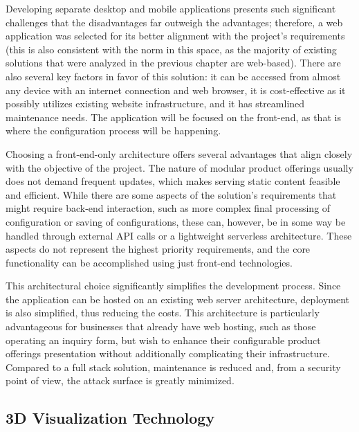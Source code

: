 Developing separate desktop and mobile applications presents such significant challenges that the disadvantages far outweigh the advantages; therefore, a web application was selected for its better alignment with the project's requirements (this is also consistent with the norm in this space, as the majority of existing solutions that were analyzed in the previous chapter are web-based). There are also several key factors in favor of this solution: it can be accessed from almost any device with an internet connection and web browser, it is cost-effective as it possibly utilizes existing website infrastructure, and it has streamlined maintenance needs. The application will be focused on the front-end, as that is where the configuration process will be happening.

Choosing a front-end-only architecture offers several advantages that align closely with the objective of the project. The nature of modular product offerings usually does not demand frequent updates, which makes serving static content feasible and efficient. While there are some aspects of the solution's requirements that might require back-end interaction, such as more complex final processing of configuration or saving of configurations, these can, however, be in some way be handled through external API calls or a lightweight serverless architecture. These aspects do not represent the highest priority requirements, and the core functionality can be accomplished using just front-end technologies.

This architectural choice significantly simplifies the development process. Since the application can be hosted on an existing web server architecture, deployment is also simplified, thus reducing the costs. This architecture is particularly advantageous for businesses that already have web hosting, such as those operating an inquiry form, but wish to enhance their configurable product offerings presentation without additionally complicating their infrastructure. Compared to a full stack solution, maintenance is reduced and, from a security point of view, the attack surface is greatly minimized.



\subsection{3D Visualization Technology} \label{section:3Dvistech}

